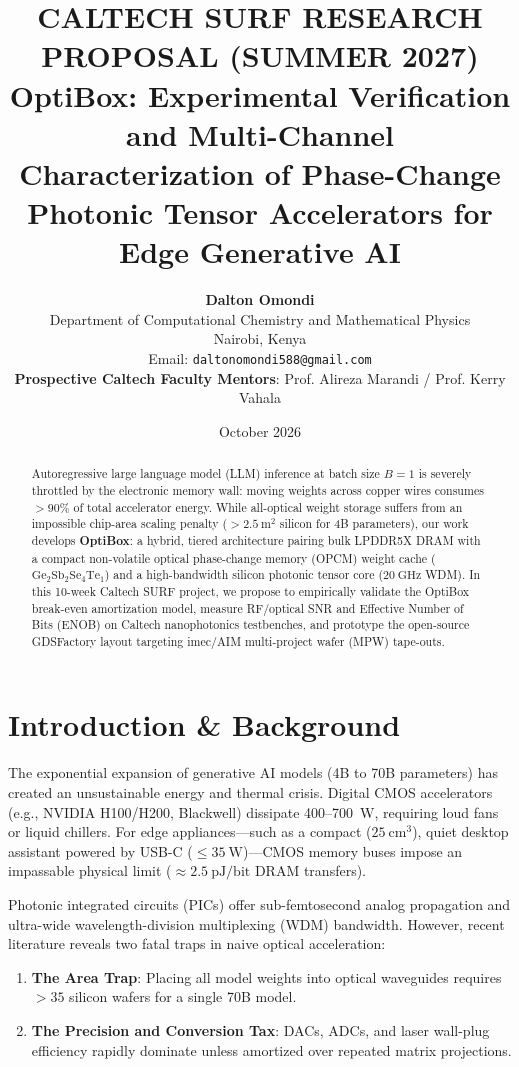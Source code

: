 \documentclass[11pt,a4paper]{article}
\title{\LARGE \textbf{CALTECH SURF RESEARCH PROPOSAL (SUMMER 2027)}\\[0.6em]
\Large \textbf{OptiBox: Experimental Verification and Multi-Channel Characterization of Phase-Change Photonic Tensor Accelerators for Edge Generative AI}}
\author{\textbf{Dalton Omondi}\\
Department of Computational Chemistry and Mathematical Physics\\
Nairobi, Kenya\\
Email: \texttt{daltonomondi588@gmail.com}\\
\textbf{Prospective Caltech Faculty Mentors}: Prof. Alireza Marandi / Prof. Kerry Vahala}
\date{October 2026}
\begin{document}
\maketitle

\begin{abstract}
Autoregressive large language model (LLM) inference at batch size $B=1$ is severely throttled by the electronic memory wall: moving weights across copper wires consumes $>90\%$ of total accelerator energy. While all-optical weight storage suffers from an impossible chip-area scaling penalty ($>2.5\ \text{m}^2$ silicon for 4B parameters), our work develops \textbf{OptiBox}: a hybrid, tiered architecture pairing bulk LPDDR5X DRAM with a compact non-volatile optical phase-change memory (OPCM) weight cache ($\text{Ge}_2\text{Sb}_2\text{Se}_4\text{Te}_1$) and a high-bandwidth silicon photonic tensor core ($20\ \text{GHz}$ WDM). In this 10-week Caltech SURF project, we propose to empirically validate the OptiBox break-even amortization model, measure RF/optical SNR and Effective Number of Bits (ENOB) on Caltech nanophotonics testbenches, and prototype the open-source GDSFactory layout targeting imec/AIM multi-project wafer (MPW) tape-outs.
\end{abstract}

\section{Introduction \& Background}
The exponential expansion of generative AI models (4B to 70B parameters) has created an unsustainable energy and thermal crisis. Digital CMOS accelerators (e.g., NVIDIA H100/H200, Blackwell) dissipate 400--700~W, requiring loud fans or liquid chillers. For edge appliances—such as a compact ($25~\text{cm}^3$), quiet desktop assistant powered by USB-C ($\le 35~\text{W}$)—CMOS memory buses impose an impassable physical limit ($\approx 2.5\ \text{pJ/bit}$ DRAM transfers).

Photonic integrated circuits (PICs) offer sub-femtosecond analog propagation and ultra-wide wavelength-division multiplexing (WDM) bandwidth. However, recent literature reveals two fatal traps in naive optical acceleration:
\begin{enumerate}
    \item \textbf{The Area Trap}: Placing all model weights into optical waveguides requires $>35$ silicon wafers for a single 70B model.
    \item \textbf{The Precision and Conversion Tax}: DACs, ADCs, and laser wall-plug efficiency rapidly dominate unless amortized over repeated matrix projections.
\end{enumerate}
\end{document}
